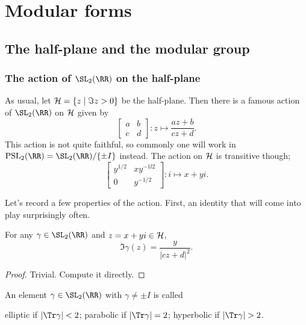 \chapter{Modular forms}
\section{The half-plane and the modular group}
\subsection{The action of $\SL_2(\RR)$ on the half-plane}
As usual, let $\mathcal H = \{ z \mid \Im z > 0 \}$ be the half-plane.
Then there is a famous action of $\SL_2(\RR)$ on $\mathcal H$ given by
\[
  \begin{bmatrix}
    a & b \\ c & d
  \end{bmatrix}
  \colon
  z \mapsto \frac{az+b}{cz+d}.
\]
This action is not quite faithful, so commonly one will work in
$\PSL_2(\RR) = \SL_2(\RR) / \{\pm I\}$ instead.
The action on $\mathcal H$ is transitive though;
\[ \begin{bmatrix}
    y^{1/2} & xy^{-1l2} \\
    0 & y^{-1/2}
  \end{bmatrix}
  : i \mapsto x+yi. \]

Let's record a few properties of the action.
First, an identity that will come into play surprisingly often.
\begin{proposition}
  For any $\gamma \in \SL_2(\RR)$ and $z = x+yi \in \mathcal H$,
  \[ \Im \gamma(z) = \frac{y}{|cz+d|^2}. \]
\end{proposition}
\begin{proof}
  Trivial.
  Compute it directly.
\end{proof}

\begin{definition}
  An element $\gamma \in \SL_2(\RR)$ with $\gamma \neq \pm I$ is called
  \begin{itemize}
    \ii \alert{elliptic} if $\left\lvert \Tr\gamma \right\rvert < 2$;
    \ii \alert{parabolic} if $\left\lvert \Tr\gamma \right\rvert = 2$;
    \ii \alert{hyperbolic} if $\left\lvert \Tr\gamma \right\rvert > 2$.
  \end{itemize}
\end{definition}

